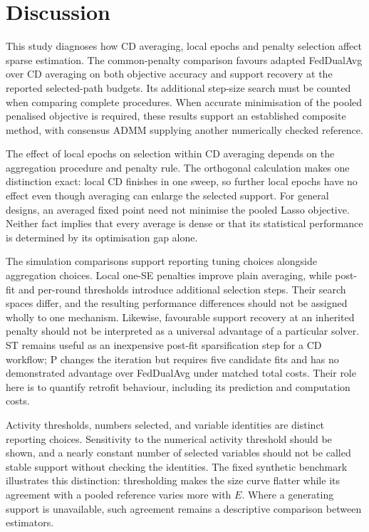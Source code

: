 \section{Discussion}
\label{sec:discussion}

This study diagnoses how CD averaging, local epochs and penalty selection
affect sparse estimation. The common-penalty comparison favours
adapted FedDualAvg over CD averaging on both objective accuracy and support
recovery at the reported selected-path budgets. Its additional step-size
search must be counted when comparing complete procedures. When accurate
minimisation of the pooled penalised objective is required, these results
support an established composite method, with consensus ADMM supplying
another numerically checked reference.

The effect of local epochs on selection within CD averaging depends on the
aggregation procedure and penalty rule. The orthogonal calculation makes
one distinction exact: local CD finishes in one sweep, so further local
epochs have no effect even though averaging can enlarge the selected support.
For general designs, an averaged fixed point need not minimise the pooled
Lasso objective. Neither fact implies that every average is dense or that
its statistical performance is determined by its optimisation gap alone.

The simulation comparisons support reporting tuning choices alongside
aggregation choices. Local one-SE penalties improve plain averaging, while
post-fit and per-round thresholds introduce additional selection steps.
Their search spaces differ, and the resulting performance differences
should not be assigned wholly to one mechanism. Likewise, favourable
support recovery at an inherited penalty should not be interpreted as a
universal advantage of a particular solver. ST remains useful as an
inexpensive post-fit sparsification step for a CD workflow; P changes the
iteration but requires five candidate fits and has no demonstrated
advantage over FedDualAvg under matched total costs. Their role here is to
quantify retrofit behaviour, including its prediction and computation costs.

Activity thresholds, numbers selected, and variable identities are distinct
reporting choices. Sensitivity to the numerical activity threshold should
be shown, and a nearly constant number of selected variables should not be
called stable support without checking the identities. The fixed synthetic
benchmark illustrates this distinction: thresholding makes the size curve
flatter while its agreement with a pooled reference varies more with $E$.
Where a generating support is unavailable, such agreement remains a
descriptive comparison between estimators.

